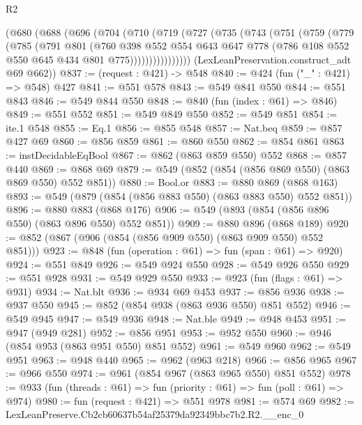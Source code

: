 \begin{lexlean}{R2}
\begin{coremodule}
      (@680
        (@688
          (@696
            (@704
              (@710
                (@719
                  (@727
                    (@735
                      (@743
                        (@751
                          (@759
                            (@779
                              (@785
                                (@791
                                  @801
                                  (@760
                                    @398
                                    @552
                                    @554
                                    @643
                                    @647
                                    @778
                                    (@786 @108 @552 @550 @645 @434 @801 @775))))))))))))))))
      (LexLeanPreservation.construct_adt @69 @662))
@837 := (request : @421) -> @548
@840 := @424 (fun ("_" : @421) => @548) @427
@841 := @551 @578
@843 := @549 @841 @550
@844 := @551 @843
@846 := @549 @844 @550
@848 := @840 (fun (index : @61) => @846)
@849 := @551 @552
@851 := @549 @849 @550
@852 := @549 @851
@854 := ite.{1} @548
@855 := Eq.{1}
@856 := @855 @548
@857 := Nat.beq
@859 := @857 @427 @69
@860 := @856 @859
@861 := @860 @550
@862 := @854 @861
@863 := instDecidableEqBool
@867 := @862 (@863 @859 @550) @552
@868 := @857 @440
@869 := @868 @69
@879 := @549 (@852 (@854 (@856 @869 @550) (@863 @869 @550) @552 @851))
@880 := Bool.or
@883 := @880 @869 (@868 @163)
@893 := @549 (@879 (@854 (@856 @883 @550) (@863 @883 @550) @552 @851))
@896 := @880 @883 (@868 @176)
@906 := @549 (@893 (@854 (@856 @896 @550) (@863 @896 @550) @552 @851))
@909 := @880 @896 (@868 @189)
@920 := @852 (@867 (@906 (@854 (@856 @909 @550) (@863 @909 @550) @552 @851)))
@923 := @848 (fun (operation : @61) => fun (span : @61) => @920)
@924 := @551 @849
@926 := @549 @924 @550
@928 := @549 @926 @550
@929 := @551 @928
@931 := @549 @929 @550
@933 := @923 (fun (flags : @61) => @931)
@934 := Nat.blt
@936 := @934 @69 @453
@937 := @856 @936
@938 := @937 @550
@945 := @852 (@854 @938 (@863 @936 @550) @851 @552)
@946 := @549 @945
@947 := @549 @936
@948 := Nat.ble
@949 := @948 @453
@951 := @947 (@949 @281)
@952 := @856 @951
@953 := @952 @550
@960 := @946 (@854 @953 (@863 @951 @550) @851 @552)
@961 := @549 @960
@962 := @549 @951
@963 := @948 @440
@965 := @962 (@963 @218)
@966 := @856 @965
@967 := @966 @550
@974 := @961 (@854 @967 (@863 @965 @550) @851 @552)
@978 := @933 (fun (threads : @61) => fun (priority : @61) => fun (poll : @61) => @974)
@980 := fun (request : @421) => @551 @978
@981 := @574 @69
@982 := LexLeanPreserve.Cb2cb60637b54af25379da92349bbc7b2.R2.__enc_0

\end{coremodule}
\end{lexlean}
